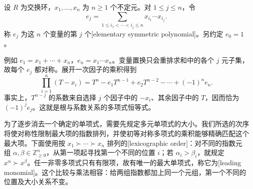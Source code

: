 \begin{definition}\label{b1:def:elementary-symmetric-polynomials}
	设 \(R\) 为交换环，\(x_1,\ldots,x_n\) 为 \(n\ge1\) 个不定元。对 \(1\le j\le n\)，令
	\[
		e_j=\sum_{1\le i_1<\cdots<i_j\le n}x_{i_1}\cdots x_{i_j}.
	\]
	称 \(e_j\) 为这 \(n\) 个变量的第 \(j\) 个[elementary symmetric polynomial]。另约定 \(e_0=1\)。
\end{definition}

例如 \(e_1=x_1+\cdots+x_n\)，\(e_n=x_1\cdots x_n\)。变量置换只会重排求和中的各个 \(j\) 元子集，故每个 \(e_j\) 都对称。展开一次因子的乘积得到
\begin{equation}\label{b1:eq:elementary-symmetric-product}
	\prod_{i=1}^n(T-x_i) =T^n-e_1T^{n-1}+e_2T^{n-2}-\cdots+(-1)^ne_n.
\end{equation}
事实上，\(T^{n-j}\) 的系数来自选择 \(j\) 个因子中的 \(-x_i\)、其余因子中的 \(T\)，因而恰为 \((-1)^je_j\)。这就是根与系数关系的多项式恒等式。

为了逐步消去一个确定的单项式，需要先规定多元单项式的大小。我们所选的次序将使对称性限制最大项的指数排列，并使初等对称多项式的乘积能够精确匹配这个最大项。下面使用按 \(x_1\succ\cdots\succ x_n\) 排列的[lexicographic order]：对不同的指数元组 \(\alpha,\beta\in\mathbb Z_{\ge0}^n\)，从第一项起寻找第一个不同的位置 \(i\)；若 \(\alpha_i>\beta_i\)，就规定 \(x^\alpha\succ x^\beta\)。任一非零多项式只有有限项，故有唯一的最大单项式，称它为[leading monomial]。这个比较与乘法相容：给两组指数都加上同一个元组，第一个不同的位置及大小关系不变。

